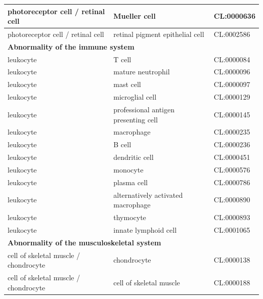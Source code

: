 \documentclass[
]{article}
\begin{document}
\begin{table}
{\begin{tabular}[t]{l|l|l}
\hline
\hspace{1em}photoreceptor cell / retinal cell & Mueller cell & CL:0000636\\
\hline
\hspace{1em}photoreceptor cell / retinal cell & retinal pigment epithelial cell & CL:0002586\\
\hline
\multicolumn{3}{l}{\textbf{Abnormality of the immune system}}\\
\hline
\hspace{1em}leukocyte & T cell & CL:0000084\\
\hline
\hspace{1em}leukocyte & mature neutrophil & CL:0000096\\
\hline
\hspace{1em}leukocyte & mast cell & CL:0000097\\
\hline
\hspace{1em}leukocyte & microglial cell & CL:0000129\\
\hline
\hspace{1em}leukocyte & professional antigen presenting cell & CL:0000145\\
\hline
\hspace{1em}leukocyte & macrophage & CL:0000235\\
\hline
\hspace{1em}leukocyte & B cell & CL:0000236\\
\hline
\hspace{1em}leukocyte & dendritic cell & CL:0000451\\
\hline
\hspace{1em}leukocyte & monocyte & CL:0000576\\
\hline
\hspace{1em}leukocyte & plasma cell & CL:0000786\\
\hline
\hspace{1em}leukocyte & alternatively activated macrophage & CL:0000890\\
\hline
\hspace{1em}leukocyte & thymocyte & CL:0000893\\
\hline
\hspace{1em}leukocyte & innate lymphoid cell & CL:0001065\\
\hline
\multicolumn{3}{l}{\textbf{Abnormality of the musculoskeletal system}}\\
\hline
\hspace{1em}cell of skeletal muscle / chondrocyte & chondrocyte & CL:0000138\\
\hline
\hspace{1em}cell of skeletal muscle / chondrocyte & cell of skeletal muscle & CL:0000188\\

\end{tabular}}
\end{table}
\end{document}
